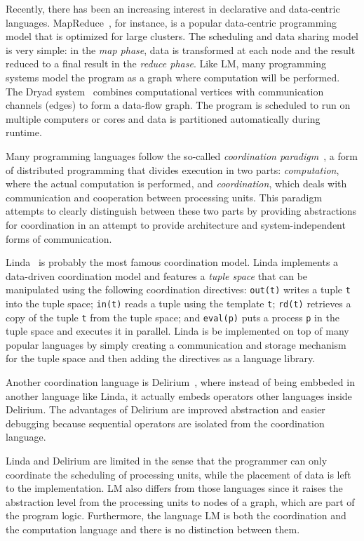 Recently, there has been an increasing interest in declarative and data-centric
languages. MapReduce~\cite{Dean:2008:MSD:1327452.1327492}, for instance, is a
popular data-centric programming model that is optimized for large clusters. The
scheduling and data sharing model is very simple: in the \emph{map phase}, data
is transformed at each node and the result reduced to a final result in the
\emph{reduce phase}. Like LM, many programming systems model the program as a
graph where computation will be performed. The Dryad
system~\cite{Isard:2007:DDD:1272996.1273005} combines computational vertices
with communication channels (edges) to form a data-flow graph. The program is
scheduled to run on multiple computers or cores and data is partitioned
automatically during runtime.

Many programming languages follow the so-called \emph{coordination
paradigm}~\cite{Papadopoulos98coordinationmodels}, a form of distributed
programming that divides execution in two parts: \emph{computation}, where the actual
computation is performed, and \emph{coordination}, which deals with
communication and cooperation between processing units. This paradigm attempts
to clearly distinguish between these two parts by providing abstractions for
coordination in an attempt to provide architecture and system-independent forms
of communication.  

Linda~\cite{linda} is probably the most famous coordination model. Linda
implements a data-driven coordination model and features a \emph{tuple space}
that can be manipulated using the following coordination directives:
\texttt{out(t)} writes a tuple \texttt{t} into the tuple space; \texttt{in(t)}
reads a tuple using the template \texttt{t}; \texttt{rd(t)} retrieves a copy of
the tuple \texttt{t} from the tuple space; and \texttt{eval(p)} puts a process
\texttt{p} in the tuple space and executes it in parallel. 
Linda is be implemented on top of many
popular languages by simply creating a communication and storage mechanism for
the tuple space and then adding the directives as a language library.

Another coordination language is Delirium~\cite{Delirium}, where instead of being
embbeded in another language like Linda, it actually embeds operators other
languages inside Delirium. The advantages of Delirium are improved abstraction
and easier debugging because sequential operators are isolated from the
coordination language.

Linda and Delirium are limited in the sense that the programmer can only
coordinate the scheduling of processing units, while the placement of data is
left to the implementation. LM also differs from those languages since it
raises the abstraction level from the processing units to nodes of a graph,
which are part of the program logic.
Furthermore, the language LM is both the coordination and the computation
language and there is no distinction between them.

